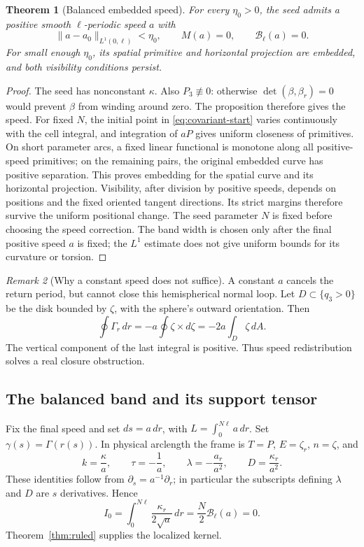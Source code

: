 \documentclass[11pt]{amsart}
\newtheorem{theorem}{Theorem}[section]
\theoremstyle{definition}
\theoremstyle{remark}
\newtheorem{remark}[theorem]{Remark}
\numberwithin{equation}{section}
\begin{document}
\begin{theorem}[Balanced embedded speed]\label{thm:spike}\label{lem:speed}
For every $\eta_0>0$, the seed admits a positive smooth $\ell$-periodic
speed $a$ with
\begin{equation}\label{eq:balanced-speed}
 \|a-a_0\|_{L^1(0,\ell)}<\eta_0,\qquad
 M(a)=0,\qquad\mathscr B_\ell(a)=0.
\end{equation}
For small enough $\eta_0$, its spatial primitive and horizontal
projection are embedded, and both visibility conditions persist.
\end{theorem}
\begin{proof}
The seed has nonconstant $\kappa$. Also $P_3\not\equiv0$: otherwise
$\det(\beta,\beta_r)=0$ would prevent $\beta$ from winding around zero.
The proposition therefore gives the speed. For fixed $N$, the initial
point in \eqref{eq:covariant-start} varies continuously with the cell
integral, and integration of $aP$ gives uniform closeness of primitives.
On short parameter arcs, a fixed linear functional is monotone along all
positive-speed primitives; on the remaining pairs, the original embedded
curve has positive separation. This proves embedding for the spatial
curve and its horizontal projection. Visibility, after division by positive
speeds, depends on positions and the fixed oriented tangent directions.
Its strict margins therefore survive the uniform positional change.
The seed parameter $N$ is fixed before choosing the speed correction.
The band width is chosen only after the final positive speed $a$ is
fixed; the $L^1$ estimate does not give uniform bounds for its curvature
or torsion.
\end{proof}

\begin{remark}[Why a constant speed does not suffice]\label{rem:constant-speed-obstruction}
A constant $a$ cancels the return period, but cannot close this
hemispherical normal loop. Let $D\subset\{q_3>0\}$ be the disk bounded
by $\zeta$, with the sphere's outward orientation. Then
\[
 \oint\Gamma_r\,dr=-a\oint\zeta\times d\zeta
 =-2a\int_D\zeta\,dA.
\]
The vertical component of the last integral is positive. Thus speed
redistribution solves a real closure obstruction.
\end{remark}

\subsection{The balanced band and its support tensor}
Fix the final speed and set $ds=a\,dr$, with
$L=\int_0^{N\ell}a\,dr$. Set $\gamma(s)=\Gamma(r(s))$.
In physical arclength the frame is
$T=P$, $E=\zeta_r$, $n=\zeta$, and
\begin{equation}\label{eq:frame-speed}
 k=\frac\kappa a,\qquad \tau=-\frac1a,\qquad
 \lambda=-\frac{a_r}{a^2},\qquad D=\frac{\kappa_r}{a^2}.
\end{equation}
These identities follow from $\partial_s=a^{-1}\partial_r$; in particular
the subscripts defining $\lambda$ and $D$ are $s$ derivatives. Hence
\[
 I_0=\int_0^{N\ell}\frac{\kappa_r}{2\sqrt a}\,dr
 =\frac N2\mathscr B_\ell(a)=0.
\]
Theorem~\ref{thm:ruled} supplies the localized kernel.
\end{document}
